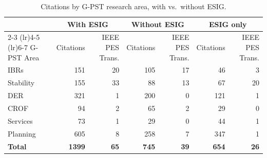 \begin{table}[htbp]
\centering
\small
\setlength{\tabcolsep}{5pt}
\begin{tabular}{lrrrrrr}
\toprule
     & \multicolumn{2}{c}{With ESIG} & \multicolumn{2}{c}{Without ESIG} & \multicolumn{2}{c}{ESIG only} \\
    \cmidrule(lr){2-3} \cmidrule(lr){4-5} \cmidrule(lr){6-7}
    G-PST Area & Citations & IEEE PES Trans. & Citations & IEEE PES Trans. & Citations & IEEE PES Trans. \\
\midrule
    IBRs & 151 & 20 & 105 & 17 & 46 & 3 \\
    Stability & 155 & 33 & 88 & 13 & 67 & 20 \\
    DER & 321 & 1 & 200 & 0 & 121 & 1 \\
    CROF & 94 & 2 & 65 & 2 & 29 & 0 \\
    Services & 73 & 1 & 29 & 0 & 44 & 1 \\
    Planning & 605 & 8 & 258 & 7 & 347 & 1 \\
\midrule
    \textbf{Total} & \textbf{1399} & \textbf{65} & \textbf{745} & \textbf{39} & \textbf{654} & \textbf{26} \\
\bottomrule
\end{tabular}
\caption{Citations by G-PST research area, with vs.\ without ESIG.}
\label{tab:citations_by_area_comparison}
\end{table}

